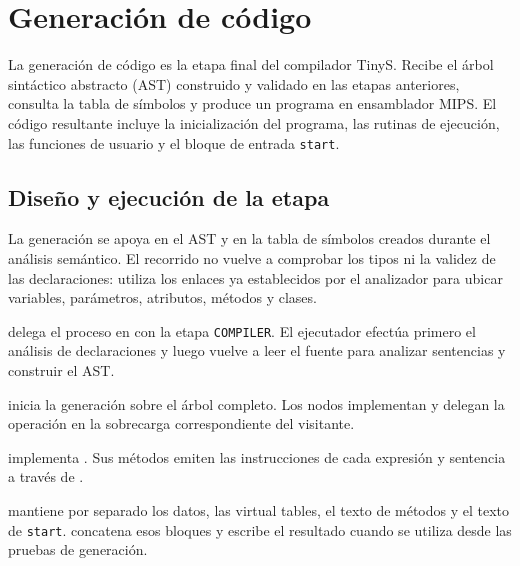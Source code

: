 \chapter{Generación de código}
\label{cap:generacion-codigo}
\begingroup
\setlength{\emergencystretch}{4em}

La generación de código es la etapa final del compilador TinyS. Recibe el
árbol sintáctico abstracto (AST) construido y validado en las etapas
anteriores, consulta la tabla de símbolos y produce un programa en
ensamblador MIPS. El código resultante incluye la inicialización del
programa, las rutinas de ejecución, las funciones de usuario y el bloque
de entrada \texttt{start}.

\section{Diseño y ejecución de la etapa}
\label{sec:diseno-generacion}

La generación se apoya en el AST y en la tabla de símbolos creados durante
el análisis semántico. El recorrido no vuelve a comprobar los tipos ni la
validez de las declaraciones: utiliza los enlaces ya establecidos por el
analizador para ubicar variables, parámetros, atributos, métodos y clases.

\begin{description}[style=nextline]
  \item[Orquestación]
   delega el proceso en
   con la etapa \texttt{COMPILER}. El
  ejecutador efectúa primero el análisis de declaraciones y luego vuelve
  a leer el fuente para analizar sentencias y construir el AST.
  \item[Inicio del recorrido]
   inicia la generación sobre el árbol completo.
  Los nodos implementan  y delegan la
  operación en la sobrecarga correspondiente del visitante.
  \item[Traducción]
   implementa . Sus
  métodos  emiten las instrucciones de cada expresión
  y sentencia a través de .
  \item[Acumulación y salida]
   mantiene por separado los datos, las virtual tables, el texto de métodos y el texto de \texttt{start}.
   concatena esos bloques y
   escribe el resultado cuando se utiliza desde
  las pruebas de generación.
\end{description}

